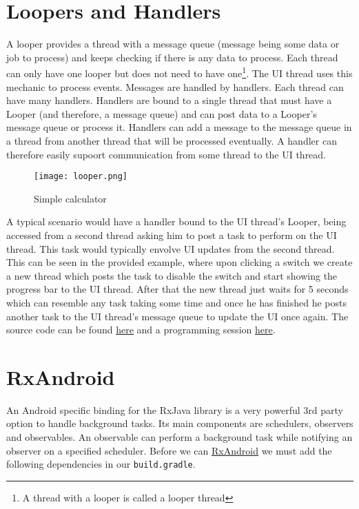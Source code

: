 \section{Loopers and Handlers}
A looper provides a thread with a message queue (message being some data or job to process) and keeps checking if there is any data to process. Each thread can only have one looper but does not need to have one\footnote{A thread with a looper is called a looper thread}. The UI thread uses this mechanic to process events. Messages are handled by handlers. Each thread can have many handlers. Handlers are bound to a single thread that must have a Looper (and therefore, a message queue) and can post data to a Looper's message queue or process it. Handlers can add a message to the message queue in a thread from another thread that will be processed eventually. A handler can therefore easily supoort communication from some thread to the UI thread.

\begin{figure}[H]
\centering
\texttt{[image: looper.png]}
\caption{Simple calculator}
\label{fig:simcal}
\end{figure}

A typical scenario would have a handler bound to the UI thread's Looper, being accessed from a second thread asking him to post a task to perform on the UI thread. This task would typically envolve UI updates from the second thread. This can be seen in the provided example, where upon clicking a switch we create a new thread which posts the task to disable the switch and start showing the progress bar to the UI thread. After that the new thread just waits for 5 seconds which can resemble any task taking some time and once he has finished he posts another task to the UI thread's message queue to update the UI once again. The source code can be found \href{https://github.com/JonSteinn/AndroidDevelopment/tree/master/examples/lab2/handlers}{here} and a programming session \href{TODO}{here}.

\section{RxAndroid}
An Android specific binding for the RxJava library is a very powerful 3rd party option to handle background tasks. Its main components are schedulers, observers and observables. An observable can perform a background task while notifying an observer on a specified scheduler. Before we can \href{https://github.com/ReactiveX/RxAndroid}{RxAndroid} we must add the following dependencies in our \texttt{build.gradle}.

